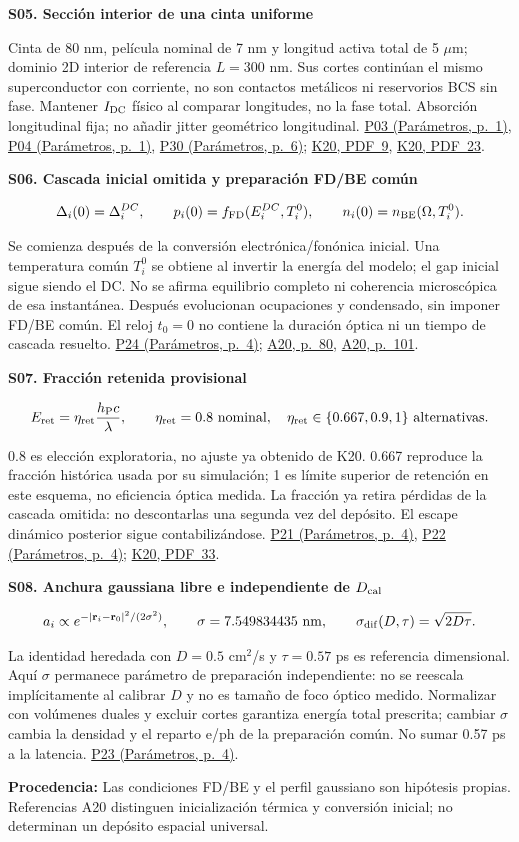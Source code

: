 \documentclass[11pt,a4paper]{article}
\newcommand{\block}[1]{\par\vspace{6pt}{\large\bfseries\color{ink}#1}\par\vspace{3pt}}
\newcommand{\origin}[1]{\par{\footnotesize\raggedright\color{ink}\textbf{Procedencia:} #1\par}}
\newcommand{\K}[1]{\href{https://eprints.lancs.ac.uk/id/eprint/140252/3/Binder1.pdf\#page=#1}{K20, PDF~#1}}
\newcommand{\A}[1]{\href{https://thesis.caltech.edu/13748/}{A20, p.~#1}}
\newcommand{\pref}[2]{\href{Parametros.pdf\#nameddest=#1}{#1 (Parámetros, p.~#2)}}
\newcommand{\assumption}[2]{\par\vspace{6pt}\hypertarget{#1}{\textbf{\color{ink}#1. #2}}\par}
\newcommand{\smallnote}[1]{{\small #1\par}}
\begin{document}
\block{Geometría y preparación fotónica}
\assumption{S05}{Sección interior de una cinta uniforme}
\smallnote{Cinta de 80 nm, película nominal de 7 nm y longitud activa total de 5 $\mu$m; dominio 2D interior de referencia $L=300$ nm. Sus cortes continúan el mismo superconductor con corriente, no son contactos metálicos ni reservorios BCS sin fase. Mantener $I_{\rm DC}$ físico al comparar longitudes, no la fase total. Absorción longitudinal fija; no añadir jitter geométrico longitudinal. \pref{P03}{1}, \pref{P04}{1}, \pref{P30}{6}; \K{9}, \K{23}.}
\assumption{S06}{Cascada inicial omitida y preparación FD/BE común}
\begin{gather*}
 \Delta_i(0)=\Delta_i^{DC},\qquad
 p_i(0)=f_{\rm FD}(E_i^{DC},T_i^0),\qquad
 n_i(0)=n_{\rm BE}(\Omega,T_i^0).
\end{gather*}
\smallnote{Se comienza después de la conversión electrónica/fonónica inicial. Una temperatura común $T_i^0$ se obtiene al invertir la energía del modelo; el gap inicial sigue siendo el DC. No se afirma equilibrio completo ni coherencia microscópica de esa instantánea. Después evolucionan ocupaciones y condensado, sin imponer FD/BE común. El reloj $t_0=0$ no contiene la duración óptica ni un tiempo de cascada resuelto. \pref{P24}{4}; \A{80}, \A{101}.}
\assumption{S07}{Fracción retenida provisional}
\begin{gather*}
 E_{\rm ret}=\eta_{\rm ret}\frac{h_{\rm P}c}{\lambda},\qquad
 \eta_{\rm ret}=0.8\ {\rm nominal},\quad
 \eta_{\rm ret}\in\{0.667,0.9,1\}\ {\rm alternativas}.
\end{gather*}
\smallnote{0.8 es elección exploratoria, no ajuste ya obtenido de K20. 0.667 reproduce la fracción histórica usada por su simulación; 1 es límite superior de retención en este esquema, no eficiencia óptica medida. La fracción ya retira pérdidas de la cascada omitida: no descontarlas una segunda vez del depósito. El escape dinámico posterior sigue contabilizándose. \pref{P21}{4}, \pref{P22}{4}; \K{33}.}
\assumption{S08}{Anchura gaussiana libre e independiente de $D_{\rm cal}$}
\begin{gather*}
 a_i\propto e^{-|\mathbf r_i-\mathbf r_0|^2/(2\sigma^2)},\qquad
 \sigma=7.549834435\ {\rm nm},\qquad
 \sigma_{\rm dif}(D,\tau)=\sqrt{2D\tau}.
\end{gather*}
\smallnote{La identidad heredada con $D=0.5$ cm$^2$/s y $\tau=0.57$ ps es referencia dimensional. Aquí $\sigma$ permanece parámetro de preparación independiente: no se reescala implícitamente al calibrar $D$ y no es tamaño de foco óptico medido. Normalizar con volúmenes duales y excluir cortes garantiza energía total prescrita; cambiar $\sigma$ cambia la densidad y el reparto e/ph de la preparación común. No sumar 0.57 ps a la latencia. \pref{P23}{4}.}
\vfill
\origin{Las condiciones FD/BE y el perfil gaussiano son hipótesis propias. Referencias A20 distinguen inicialización térmica y conversión inicial; no determinan un depósito espacial universal.}
\newpage
\end{document}
